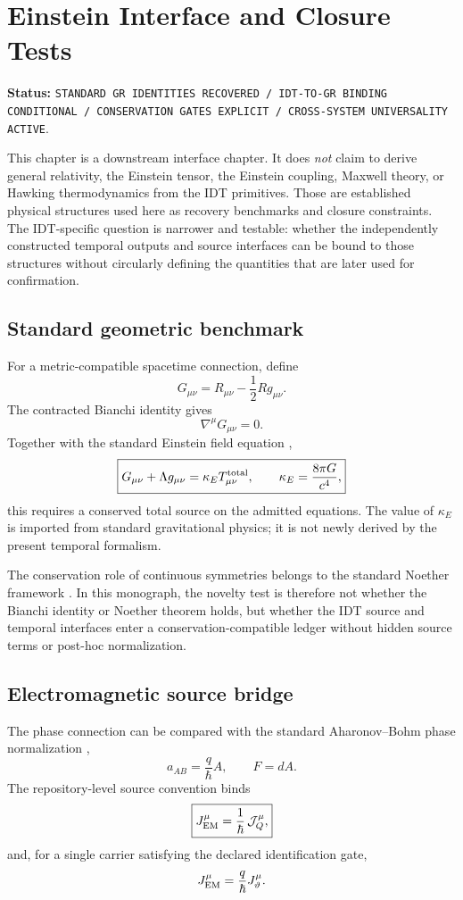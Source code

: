 \chapter{Einstein Interface and Closure Tests}

\noindent\textbf{Status:} \texttt{STANDARD GR IDENTITIES RECOVERED / IDT-TO-GR BINDING CONDITIONAL / CONSERVATION GATES EXPLICIT / CROSS-SYSTEM UNIVERSALITY ACTIVE}.

This chapter is a downstream interface chapter. It does \emph{not} claim to derive general relativity, the Einstein tensor, the Einstein coupling, Maxwell theory, or Hawking thermodynamics from the IDT primitives. Those are established physical structures used here as recovery benchmarks and closure constraints. The IDT-specific question is narrower and testable: whether the independently constructed temporal outputs and source interfaces can be bound to those structures without circularly defining the quantities that are later used for confirmation.

\section{Standard geometric benchmark}

For a metric-compatible spacetime connection, define
\[
G_{\mu\nu}=R_{\mu\nu}-\frac12Rg_{\mu\nu}.
\]
The contracted Bianchi identity gives
\[
\boxed{\nabla^\mu G_{\mu\nu}=0.}
\]
Together with the standard Einstein field equation \cite{Einstein1916},
\[
\boxed{
G_{\mu\nu}+\Lambda g_{\mu\nu}
=
\kappa_E T^{\rm total}_{\mu\nu},
\qquad
\kappa_E=\frac{8\pi G}{c^4},
}
\]
this requires a conserved total source on the admitted equations. The value of \(\kappa_E\) is imported from standard gravitational physics; it is not newly derived by the present temporal formalism.

The conservation role of continuous symmetries belongs to the standard Noether framework \cite{Noether1971}. In this monograph, the novelty test is therefore not whether the Bianchi identity or Noether theorem holds, but whether the IDT source and temporal interfaces enter a conservation-compatible ledger without hidden source terms or post-hoc normalization.

\section{Electromagnetic source bridge}

The phase connection can be compared with the standard Aharonov--Bohm phase normalization \cite{AharonovBohm1959},
\[
a_{AB}=\frac{q}{\hbar}A,
\qquad
F=dA.
\]
The repository-level source convention binds
\[
\boxed{
J_{\rm EM}^{\mu}=\frac{1}{\hbar}\,\mathcal J_Q^{\mu},
}
\]
and, for a single carrier satisfying the declared identification gate,
\[
J_{\rm EM}^{\mu}=\frac{q}{\hbar}J_{\vartheta}^{\mu}.
\]

